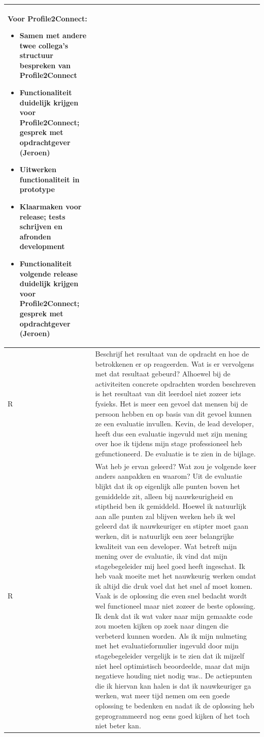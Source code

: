 \begin{tabularx}{\textwidth}{| l | X |}
Voor Profile2Connect:
\begin{itemize}
\item Samen met andere twee collega's structuur bespreken van Profile2Connect
\item Functionaliteit duidelijk krijgen voor Profile2Connect; gesprek met opdrachtgever (Jeroen)
\item Uitwerken functionaliteit in prototype
\item Klaarmaken voor release; tests schrijven en afronden development
\item Functionaliteit volgende release duidelijk krijgen voor Profile2Connect; gesprek met opdrachtgever (Jeroen)
\end{itemize}
\\
\hline
R & Beschrijf het resultaat van de opdracht en hoe de betrokkenen er op reageerden. Wat is er vervolgens met dat resultaat gebeurd?
\newline
\newline
Alhoewel bij de activiteiten concrete opdrachten worden beschreven is het resultaat van dit leerdoel niet zozeer iets fysieks. Het is meer een gevoel dat mensen bij de persoon hebben en op basis van dit gevoel kunnen ze een evaluatie invullen.
Kevin, de lead developer, heeft dus een evaluatie ingevuld met zijn mening over hoe ik tijdens mijn stage professioneel heb gefunctioneerd. De evaluatie is te zien in de bijlage.
\\
\hline
R & Wat heb je ervan geleerd? Wat zou je volgende keer anders aanpakken en waarom?
\newline
\newline
Uit de evaluatie blijkt dat ik op eigenlijk alle punten boven het gemiddelde zit, alleen bij nauwkeurigheid en stiptheid ben ik gemiddeld. Hoewel ik natuurlijk aan alle punten zal blijven werken heb ik wel geleerd dat ik nauwkeuriger en stipter moet gaan werken, dit is natuurlijk een zeer belangrijke kwaliteit van een developer.
\newline
Wat betreft mijn mening over de evaluatie, ik vind dat mijn stagebegeleider mij heel goed heeft ingeschat. Ik heb vaak moeite met het nauwkeurig werken omdat ik altijd die druk voel dat het snel af moet komen. Vaak is de oplossing die even snel bedacht wordt wel functioneel maar niet zozeer de beste oplossing. Ik denk dat ik wat vaker naar mijn gemaakte code zou moeten kijken op zoek naar dingen die verbeterd kunnen worden. Als ik mijn nulmeting met het evaluatieformulier ingevuld door mijn stagebegeleider vergelijk is te zien dat ik mijzelf niet heel optimistisch beoordeelde, maar dat mijn negatieve houding niet nodig was.. De actiepunten die ik hiervan kan halen is dat ik nauwkeuriger ga werken, wat meer tijd nemen om een goede oplossing te bedenken en nadat ik de oplossing heb geprogrammeerd nog eens goed kijken of het toch niet beter kan.

\end{tabularx}
